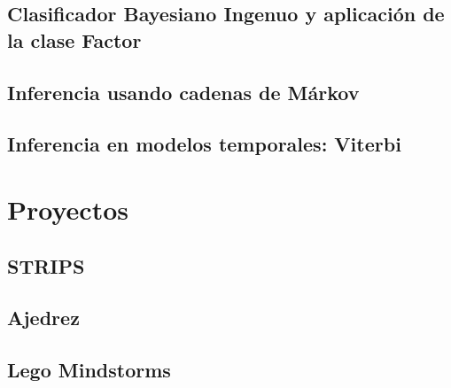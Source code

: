 \documentclass[12pt,openany]{book}
\begin{document}




\chapter[Bayes Ingenuo]{Clasificador Bayesiano Ingenuo y aplicación de la clase Factor}





\chapter{Inferencia usando cadenas de Márkov}





\chapter{Inferencia en modelos temporales: Viterbi}








\part{Proyectos}



\chapter{STRIPS}




\chapter{Ajedrez}




\chapter{Lego Mindstorms}
\end{document}
